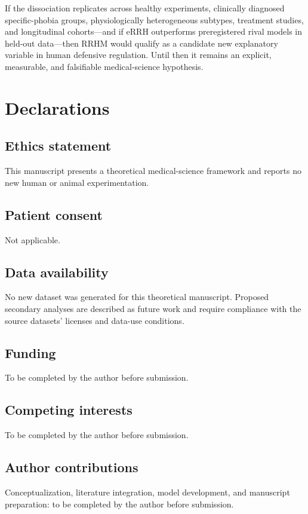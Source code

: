 \documentclass[9pt,twocolumn]{article}
\begin{document}
If the dissociation replicates across healthy experiments, clinically diagnosed specific-phobia groups, physiologically heterogeneous subtypes, treatment studies, and longitudinal cohorts---and if eRRH outperforms preregistered rival models in held-out data---then RRHM would qualify as a candidate new explanatory variable in human defensive regulation. Until then it remains an explicit, measurable, and falsifiable medical-science hypothesis.

\section*{Declarations}
\subsection*{Ethics statement}
This manuscript presents a theoretical medical-science framework and reports no new human or animal experimentation.

\subsection*{Patient consent}
Not applicable.

\subsection*{Data availability}
No new dataset was generated for this theoretical manuscript. Proposed secondary analyses are described as future work and require compliance with the source datasets' licenses and data-use conditions.

\subsection*{Funding}
To be completed by the author before submission.

\subsection*{Competing interests}
To be completed by the author before submission.

\subsection*{Author contributions}
Conceptualization, literature integration, model development, and manuscript preparation: to be completed by the author before submission.
\end{document}
